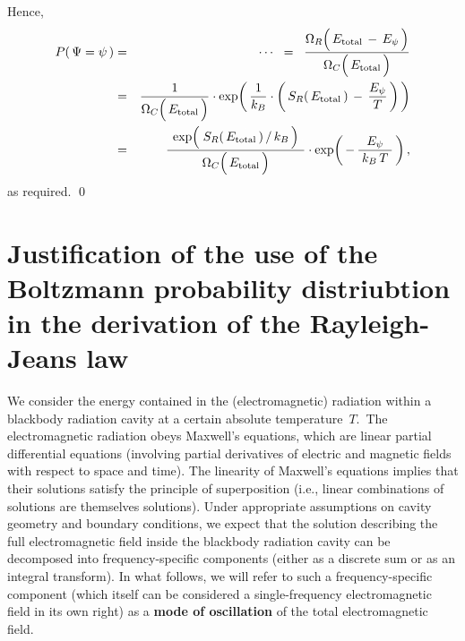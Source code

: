 \noindent
Hence,
\begin{eqnarray*}
P(\,\Psi = \psi\,)
& = &
    \cdots
\;\; = \;\;
    \dfrac{
        \Omega_{R}\!\left(\,E_{\textnormal{total}} \,\overset{{\color{white}.}}{-}\, E_{\psi}\,\right)
        }{
        \Omega_{C}\!\left(\,\overset{{\color{white}.}}{E_{\textnormal{total}}}\,\right)
        }
\\
& = &
    \dfrac{1}{\Omega_{C}\!\left(\,\overset{{\color{white}.}}{E_{\textnormal{total}}}\,\right)}
    \cdot
    \exp\!\left(\,
        \dfrac{1}{k_{B}}
        \cdot
        \left(\,
            S_{R}\!\left(\,E_{\textnormal{total}}\,\right)
            \, - \,
            \dfrac{E_{\psi}}{T}
            \,\right)
        \,\right)
\\
& = &
    \dfrac{
        {\color{white}.}
        \exp\!\left(\,\overset{{\color{white}.}}{
            \left.S_{R}\!\left(\,E_{\textnormal{total}}\,\right)\,\right\slash k_{B}
            }\,\right)
        {\color{white}.}
        }{
        \Omega_{C}\!\left(\,\overset{{\color{white}.}}{E_{\textnormal{total}}}\,\right)
        }
    \cdot
    \exp\!\left(\,
        - \,
        \dfrac{
            E_{\psi}
            }{
            {\color{white}.}
            k_{B}\,T
            {\color{white}.}
            }
        \,\right),
\end{eqnarray*}
as required.
\qed


\vskip 0.5cm
\section{Justification of the use of the Boltzmann probability distriubtion
in the derivation of the Rayleigh-Jeans law}


We consider the energy contained in the (electromagnetic) radiation
within a blackbody radiation cavity at a certain absolute temperature \,$T$.\,
The electromagnetic radiation obeys Maxwell's equations,
which are linear partial differential equations
(involving partial derivatives of electric and magnetic fields
with respect to space and time).
The linearity of Maxwell's equations implies that their solutions
satisfy the principle of superposition
(i.e., linear combinations of solutions are themselves solutions).
Under appropriate assumptions on cavity geometry and boundary conditions,
we expect that the solution describing the full electromagnetic field
inside the blackbody radiation cavity
can be decomposed into frequency-specific components
(either as a discrete sum or as an integral transform).
In what follows, we will refer to such a frequency-specific component
(which itself can be considered a single-frequency electromagnetic field in its own right)
as a \textbf{mode of oscillation} of the total electromagnetic field.

